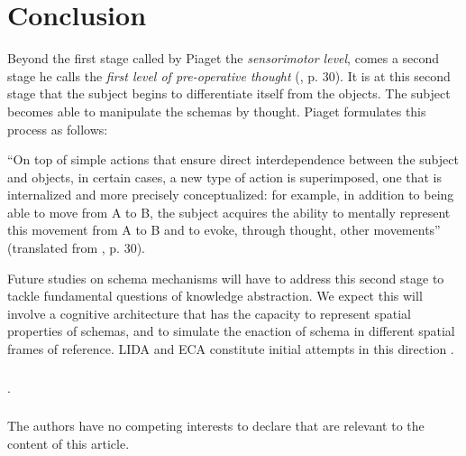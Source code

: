 \documentclass[runningheads]{llncs}
\begin{document}
\section{Conclusion}

Beyond the first stage called by Piaget the \textit{sensorimotor level}, comes a second stage he calls the \textit{first level of pre-operative thought} (\cite{piaget_lepistemologie_2011}, p. 30). 
It is at this second stage that the subject begins to differentiate itself from the objects. 
The subject becomes able to manipulate the schemas by thought. 
Piaget formulates this process as follows: 
\\

\begin{adjustwidth}{1cm}{1cm}
``On top of simple actions that ensure direct interdependence between the subject and objects, in certain cases, a new type of action is superimposed, one that is internalized and more precisely conceptualized: for example, in addition to being able to move from A to B, the subject acquires the ability to mentally represent this movement from A to B and to evoke, through thought, other movements'' (translated from \cite{piaget_lepistemologie_2011}, p. 30).\\

\end{adjustwidth}

Future studies on schema mechanisms will have to address this second stage to tackle fundamental questions of knowledge abstraction. 
We expect this will involve a cognitive architecture that has the capacity to represent spatial properties of schemas, and to simulate the enaction of schema in different spatial frames of reference. LIDA and ECA \cite{georgeon_artificial_2024} constitute initial attempts in this direction . 


\begin{credits}
\subsubsection{\ackname} .

\subsubsection{\discintname}
The authors have no competing interests to declare that are
relevant to the content of this article.
\end{credits}
%
%
%


%
\end{document}

